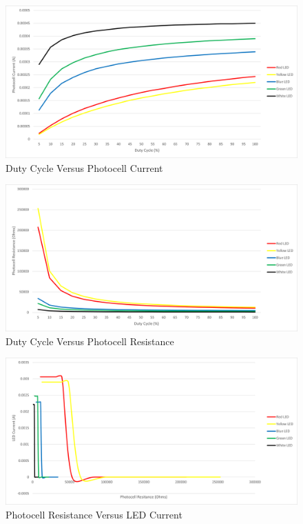 \documentclass[12pt,titlepage]{article}
\begin{document}
\begin{figure}[!htb]
    \centering
    \includegraphics[width=5in]{lab_4/duty_cycle_photo_curr.png}
    \caption{Duty Cycle Versus Photocell Current}\label{fig:duty_cycle_photo_curr}
\end{figure}
\begin{figure}[!htb]
  \centering
  \includegraphics[width=5in]{lab_4/duty_cycle_photo_res.png}
  \caption{Duty Cycle Versus Photocell Resistance}\label{fig:duty_cycle_photo_res}
\end{figure}
\begin{figure}[!htb]
    \centering
    \includegraphics[width=5in]{lab_4/photo_res_led_curr.png}
    \caption{Photocell Resistance Versus LED Current}\label{fig:photo_res_led_curr}
\end{figure}
\end{document}
